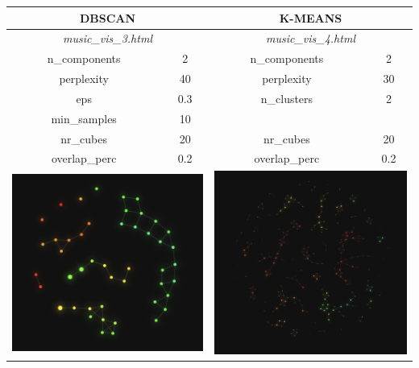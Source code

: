 \documentclass[12pt]{article}
\begin{document}
\begin{table}[H]
\begin{tabular}{|c|c|c|c|}
	\multicolumn{2}{c}{DBSCAN} & \multicolumn{2}{c}{K-MEANS}\\ \hline
	\multicolumn{2}{c}{\textit{music\_vis\_3.html}} & \multicolumn{2}{c}{\textit{music\_vis\_4.html}}\\ \hline
n\_components & 2 & n\_components & 2\\\hline
perplexity & 40 & perplexity & 30\\\hline
eps & 0.3 & n\_clusters & 2\\\hline
min\_samples & 10 &  & \\\hline
nr\_cubes & 20 & nr\_cubes & 20\\\hline
overlap\_perc & 0.2 & overlap\_perc & 0.2\\\hline
	\multicolumn{2}{c}{\includegraphics[scale=0.4]{figures/mydata3}} & 	\multicolumn{2}{c}{\includegraphics[scale=0.28]{figures/mydata4}}
	
\end{tabular}
\end{table}
\end{document}
